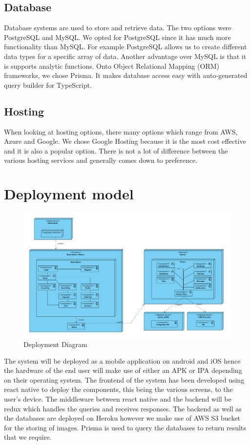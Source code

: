 \documentclass[hidelinks, 12pt, a4paper]{article}
\begin{document}
\subsection{Database}
Database systems are used to store and retrieve data.
The two options were PostgreSQL and MySQL.
We opted for PostgreSQL since it has much more functionality than MySQL.
For example PostgreSQL allows us to create different data types for a specific array of data.
Another advantage over MySQL is that it is supports analytic functions.
\newline
\newline
Onto Object Relational Mapping (ORM) frameworks, we chose Prisma.
It makes database access easy with auto-generated query builder for TypeScript.
\subsection{Hosting}
When looking at hosting options, there many options which range from AWS, Azure and Google.
We chose Google Hosting because it is the most cost effective and it is also a popular option.
There is not a lot of difference between the various hosting services and generally comes down to preference.
\newpage
\section{Deployment model}
\begin{figure}[H]

      \centering
      \includegraphics[width=15cm]{images/Deployemnt.png}
      \caption{Deployment Diagram}
      \label{fig:User UseCases}

\end{figure}
\newline
The system will be deployed as a mobile application on android and iOS hence the hardware of the end user will make use of either an APK or IPA depending on their operating system. The frontend of the system has been developed using react native to deploy the components, this being the various screens, to the user’s device. The middleware between react native and the backend will be redux which handles the queries and receives responses. The backend as well as the databases are deployed on Heroku however we make use of AWS S3 bucket for the storing of images. Prisma is used to query the databases to return results that we require.
\end{document}
